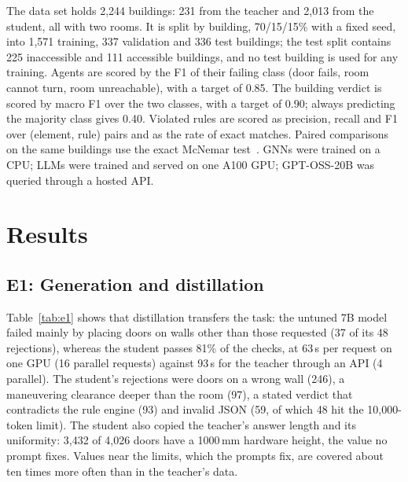 \documentclass[conference]{IEEEtran}
\begin{document}
The data set holds 2,244 buildings: 231 from the teacher and 2,013 from the student, all with two rooms. It is split
by building, 70/15/15\% with a fixed seed, into 1,571 training, 337 validation and 336 test buildings; the test split
contains 225 inaccessible and 111 accessible buildings, and no test building is used for any training. Agents are
scored by the F1 of their failing class (door fails, room cannot turn, room unreachable), with a target of 0.85. The
building verdict is scored by macro F1 over the two classes, with a target of 0.90; always predicting the majority
class gives 0.40. Violated rules are scored as precision, recall and F1 over (element, rule) pairs and as the rate of
exact matches. Paired comparisons on the same buildings use the exact McNemar test~\cite{mcnemar1947}. GNNs were
trained on a CPU; LLMs were trained and served on one A100 GPU; GPT-OSS-20B was queried through a hosted API.

\section{Results}

\subsection{E1: Generation and distillation}

\begin{table}[t]
\caption{E1: Valid buildings per generator}
\label{tab:e1}
\centering
{}
\end{table}

Table~\ref{tab:e1} shows that distillation transfers the task: the untuned 7B model failed mainly by placing doors on
walls other than those requested (37 of its 48 rejections), whereas the student passes 81\% of the checks, at 63\,s
per request on one GPU (16 parallel requests) against 93\,s for the teacher through an API (4 parallel). The student's rejections were doors on a wrong
wall (246), a maneuvering clearance deeper than the room (97), a stated verdict that contradicts the rule engine
(93) and invalid JSON (59, of which 48 hit the 10,000-token limit). The student also copied the teacher's answer
length and its uniformity: 3,432 of 4,026 doors have a 1000\,mm hardware height, the value no prompt fixes. Values
near the limits, which the prompts fix, are covered about ten times more often than in the teacher's data.
\end{document}
